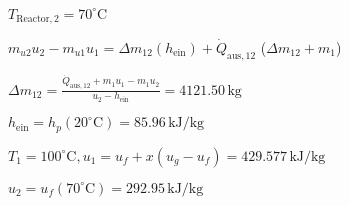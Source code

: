 \( T_{\text{Reactor},2} = 70^\circ \text{C} \)  

\( m_{u2} u_2 - m_{u1} u_1 = \Delta m_{12} (h_{\text{ein}}) + \dot{Q}_{\text{aus},12} \)  
(\( \Delta m_{12} + m_1 \))  

\( \Delta m_{12} = \frac{\dot{Q}_{\text{aus},12} + m_1 u_1 - m_1 u_2}{u_2 - h_{\text{ein}}} = 4121.50 \, \text{kg} \)  

\( h_{\text{ein}} = h_p (20^\circ \text{C}) = 85.96 \, \text{kJ/kg} \)  

\( T_1 = 100^\circ \text{C}, u_1 = u_f + x (u_g - u_f) = 429.577 \, \text{kJ/kg} \)  

\( u_2 = u_f (70^\circ \text{C}) = 292.95 \, \text{kJ/kg} \)